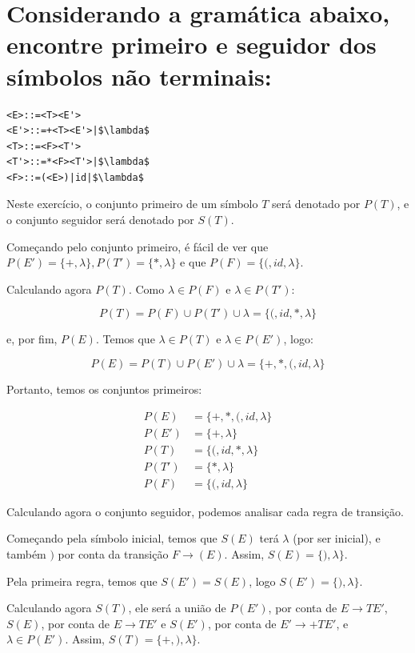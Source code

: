 \documentclass{article}
\begin{document}
\newpage
\section{Considerando a gramática abaixo, encontre primeiro e seguidor dos símbolos não terminais:}

\begin{center}
\begin{lstlisting}
<E>::=<T><E'>
<E'>::=+<T><E'>|$\lambda$
<T>::=<F><T'>
<T'>::=*<F><T'>|$\lambda$
<F>::=(<E>)|id|$\lambda$
\end{lstlisting}
\end{center}

Neste exercício, o conjunto primeiro de um símbolo $T$ será denotado por $P(T)$, e o conjunto seguidor será denotado por $S(T)$.

Começando pelo conjunto primeiro, é fácil de ver que $P(E') = \{+, \lambda\}, P(T') = \{*, \lambda\}$ e que $P(F) = \{(, id, \lambda\}$.

Calculando agora $P(T)$. Como $\lambda \in P(F)$ e $\lambda \in P(T')$:

$$P(T) = P(F) \cup P(T') \cup \lambda = \{(, id, *, \lambda\}$$

\noindent e, por fim, $P(E)$. Temos que $\lambda \in P(T)$ e $\lambda \in P(E')$, logo:

$$P(E) = P(T) \cup P(E') \cup \lambda = \{+, *, (, id, \lambda\}$$

Portanto, temos os conjuntos primeiros:

\begin{align*}
	P(E) &= \{+, *, (, id, \lambda\}\\
	P(E') &= \{+, \lambda           \}\\
	P(T) &= \{   (, id, *, \lambda                    \}\\
	P(T') &= \{  *, \lambda               \}\\
	P(F) &= \{ (, id, \lambda          \}
\end{align*}	
	
Calculando agora o conjunto seguidor, podemos analisar cada regra de transição.

Começando pela símbolo inicial, temos que $S(E)$ terá $\lambda$ (por ser inicial), e também $)$ por conta da transição $F \rightarrow (E)$. Assim, $S(E) = \{), \lambda\}$.

Pela primeira regra, temos que $S(E') = S(E)$, logo $S(E') = \{), \lambda\}$.

Calculando agora $S(T)$, ele será a união de $P(E')$, por conta de $E \rightarrow TE'$, $S(E)$, por conta de $E \rightarrow TE'$ e $S(E')$, por conta de $E' \rightarrow +TE'$, e $\lambda \in P(E')$. Assim, $S(T) = \{+, ), \lambda\}$.
\end{document}
